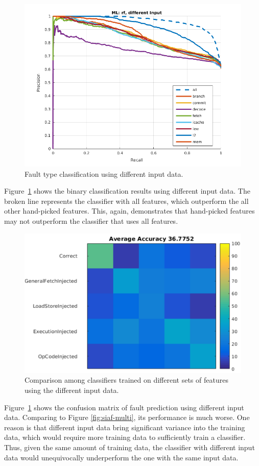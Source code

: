 \begin{figure}[t]
\begin{center}
   \includegraphics[width=0.8\linewidth]{./figures/didf.png}
\end{center}
    \vspace{-0.4cm}
   \caption{Fault type classification using different input data.}

\label{fig:didf}
\end{figure}

Figure~\ref{fig:didf} shows the binary classification results using different input data. The broken line represents the classifier with all features, which outperform the all other hand-picked features. This, again, demonstrates that hand-picked features may not outperform the classifier that uses all features.

\begin{figure}[t]
\begin{center}
   \includegraphics[width=0.8\linewidth]{./figures/diaf_multi.png}
\end{center}
 \vspace{-0.4cm}
   \caption{Comparison among classifiers trained on different sets of features using the different input data.}
\label{fig:diaf-multi}
\end{figure}

Figure~\ref{fig:didf} shows the confusion matrix of fault prediction using different input data. Comparing to Figure \ref{fig:siaf-multi}, its performance is much worse. One reason is that different input data bring significant variance into the training data, which would require more training data to sufficiently train a classifier. Thus, given the same amount of training data, the classifier with different input data would unequivocally underperform the one with the same input data.

